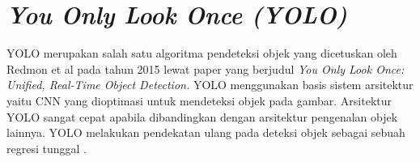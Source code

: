 


\section{\textit{You Only Look Once (YOLO)}}
\label{sec:yolo}
YOLO merupakan salah satu algoritma pendeteksi objek yang dicetuskan oleh Redmon et al pada tahun 2015 lewat paper yang berjudul \textit{You Only Look Once: Unified, Real-Time Object Detection.} YOLO menggunakan basis sistem arsitektur yaitu CNN yang dioptimasi untuk mendeteksi objek pada gambar. Arsitektur YOLO sangat cepat apabila dibandingkan dengan arsitektur pengenalan objek lainnya. YOLO melakukan pendekatan ulang pada deteksi objek sebagai sebuah regresi tunggal \citep*{redmon2016you}. \par


